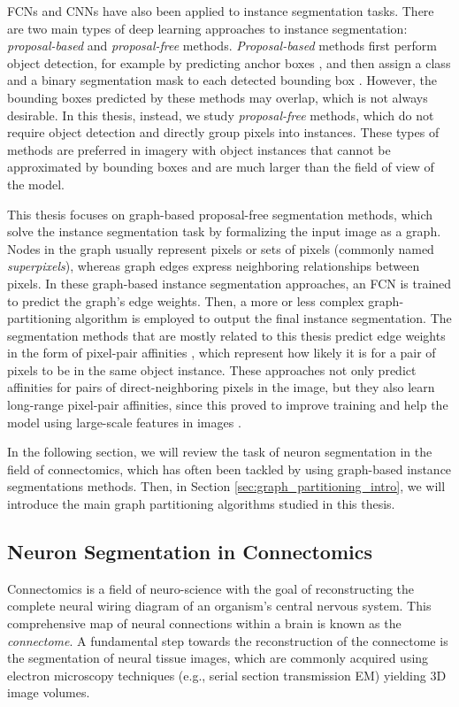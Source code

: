 FCNs and CNNs have also been applied to instance segmentation tasks.
There are two main types of deep learning approaches to instance segmentation: \emph{proposal-based} and \emph{proposal-free} methods. 
\emph{Proposal-based} methods first perform object detection, for example by predicting anchor boxes \cite{ren2015faster}, and then assign a class and a binary segmentation mask to each detected bounding box \cite{he2017mask,porzi2019seamless}.
However, the bounding boxes predicted by these methods may overlap, which is not always desirable. 
In this thesis, instead, we study \emph{proposal-free} methods, which do not require object detection and directly group pixels into instances. 
These types of methods are preferred in imagery with object instances that cannot be approximated by bounding boxes and are much larger than the field of view of the model. 

This thesis focuses on graph-based proposal-free segmentation methods, which solve the instance segmentation task by formalizing the input image as a graph. Nodes in the graph usually represent pixels or sets of pixels (commonly named \emph{superpixels}), whereas graph edges express neighboring relationships between pixels. In these graph-based instance segmentation approaches, an FCN is trained to predict the graph's edge weights. Then, a more or less complex graph-partitioning algorithm is employed to output the final instance segmentation. 
The segmentation methods that are mostly related to this thesis predict edge weights in the form of pixel-pair affinities \cite{Gao_2019_ICCV,liu2018affinity,lee2017superhuman}, which represent how likely it is for a pair of pixels to be in the same object instance. These approaches not only predict affinities for pairs of direct-neighboring pixels in the image, but they also learn long-range pixel-pair affinities, since this proved to improve training and help the model using large-scale features in images \cite{lee2017superhuman}.

In the following section, we will review the task of neuron segmentation in the field of connectomics, which has often been tackled by using graph-based instance segmentations methods. Then, in Section \ref{sec:graph_partitioning_intro}, we will introduce the main graph partitioning algorithms studied in this thesis.



 
\subsection{Neuron Segmentation in Connectomics}
Connectomics is a field of neuro-science with the goal of reconstructing the complete neural wiring diagram of an organism's central nervous system. This comprehensive map of neural connections within a brain is known as the \emph{connectome}. A fundamental step towards the reconstruction of the connectome is the segmentation of neural tissue images, which are commonly acquired using electron microscopy techniques (e.g., serial section transmission EM) yielding 3D image volumes. 

